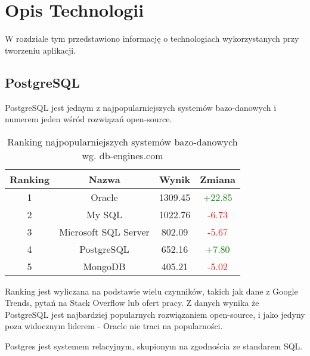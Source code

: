 \chapter{Opis Technologii}
\label{cha:Tech}

W rozdziale tym przedstawiono informację o technologiach wykorzystanych przy tworzeniu aplikacji.


\section{PostgreSQL}
\label{sec:PSQL}

    PostgreSQL jest jednym z najpopularniejszych systemów bazo-danowych i numerem jeden wśród rozwiązań open-source. 

    \begin{table}[H]
    \begin{center}
        \caption{Ranking najpopularniejszych systemów bazo-danowych wg. db-engines.com \cite{DbEg01}}
        \begin{tabular}{|c|c|c|c|}
            \hline
            Ranking & Nazwa & Wynik & Zmiana \\
            \hline
            1 & Oracle  & 1309.45 & \textcolor{Green}{+22.85} \\
            \hline
            2 & My SQL & 1022.76 & \textcolor{Red}{-6.73}  \\
            \hline
            3 & Microsoft SQL Server & 802.09 & \textcolor{Red}{-5.67} \\
            \hline
            4 & PostgreSQL & 652.16 &  \textcolor{Green}{+7.80} \\
            \hline
            5 & MongoDB & 405.21 & \textcolor{Red}{-5.02} \\
            \hline
        \end{tabular}
        \end{center}
    \end{table}

    Ranking jest wyliczana na podstawie wielu czynników, takich jak dane z Google Trends, pytań na Stack Overflow lub ofert pracy. Z danych wynika że PostgreSQL jest najbardziej popularnych rozwiązaniem open-source, i jako jedyny poza widocznym liderem - Oracle nie traci na popularności.

    Postgres jest systemem relacyjnym, skupionym na zgodnościa ze standarem SQL. 


